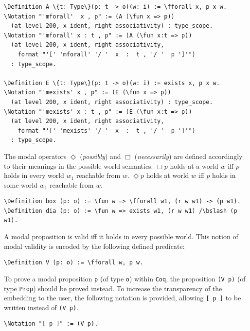 \documentclass{llncs}
\newcommand{\nec}{\Box} %
\newcommand{\pos}{\Diamond} %
\newcommand{\red}[1]{\textcolor[rgb]{1,0,0}{#1}}
\newcommand{\blue}[1]{\textcolor[rgb]{0,0,1}{#1}}
\newcommand{\Definition}{\red{Definition}}
\newcommand{\Notation}{\blue{Notation}}
\newcommand{\fforall}{\blue{forall}}
\newcommand{\fun}{\blue{fun}}
\newcommand{\bslash}{\symbol{92}}
\newcommand{\Coq}{\texttt{Coq}\xspace}
\begin{document}
\begin{Verbatim}[commandchars=\\\{\},fontsize=\verbsize]
\Definition A \{t: Type\}(p: t -> o)(w: i) := \fforall x, p x w.
\Notation "'mforall'  x , p" := (A (\fun x => p))
  (at level 200, x ident, right associativity) : type_scope.
\Notation "'mforall' x : t , p" := (A (\fun x:t => p))
  (at level 200, x ident, right associativity, 
    format "'[' 'mforall' '/ '  x  :  t , '/ '  p ']'")
  : type_scope.

\Definition E \{t: Type\}(p: t -> o)(w: i) := exists x, p x w.
\Notation "'mexists' x , p" := (E (\fun x => p))
  (at level 200, x ident, right associativity) : type_scope.
\Notation "'mexists' x : t , p" := (E (\fun x:t => p))
  (at level 200, x ident, right associativity, 
    format "'[' 'mexists' '/ '  x  :  t , '/ '  p ']'")
  : type_scope.
\end{Verbatim}

\noindent 
The modal operators $\Diamond$ (\emph{possibly}) and $\Box$
(\emph{necessarily}) are defined accordingly to their meanings in the
possible world semantics. $\nec p$ holds at a world $w$ iff $p$ holds
in every world $w_1$ reachable from $w$. $\pos p$ holds at world $w$
iff $p$ holds in some world $w_1$ reachable from $w$.

\begin{Verbatim}[commandchars=\\\{\},fontsize=\verbsize]
\Definition box (p: o) := \fun w => \fforall w1, (r w w1) -> (p w1).
\Definition dia (p: o) := \fun w => exists w1, (r w w1) /\bslash (p w1).
\end{Verbatim}


\noindent
A modal proposition is valid iff it holds in every possible world. 
This notion of modal validity is encoded by the following defined predicate:

\begin{Verbatim}[commandchars=\\\{\},fontsize=\verbsize]
\Definition V (p: o) := \fforall w, p w.
\end{Verbatim}

\noindent 
To prove a modal proposition \texttt{p} (of type \texttt{o})
within \Coq, the proposition \texttt{(V p)} (of type \texttt{Prop})
should be proved instead. To increase the transparency of the
embedding to the user, the following notation is provided, allowing
\texttt{[ p ]} to be written instead of \texttt{(V p)}.

\begin{Verbatim}[commandchars=\\\{\},fontsize=\verbsize]
\Notation "[ p ]" := (V p).
\end{Verbatim}
\end{document}
